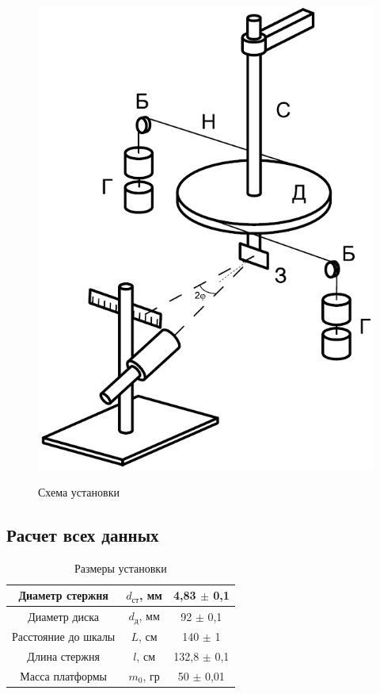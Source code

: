 \documentclass[a4paper]{article}
\begin{document}
\begin{figure}[!h]
    \begin{center}
        \includegraphics[scale=0.7]{ystanovka1.png}
        \begin{center}
        \caption{Схема установки}
        \end{center}
        \label{graphic1b}
    \end{center}
\end{figure}


\newpage
\subsection{Расчет всех данных}

\begin{table}[h!]
\begin{center}
\begin{tabular}{|c|c|c|}
\hline
Диаметр стержня     & $d_{\text{ст}}$, мм & 4,83 $\pm$ 0,1  \\ \hline
Диаметр диска       & $d_{\text{д}}$, мм  & 92 $\pm$ 0,1    \\ \hline
Расстояние до шкалы & $L$, см             & 140 $\pm$ 1     \\ \hline
Длина стержня       & $l$, см             & 132,8 $\pm$ 0,1 \\ \hline
Масса платформы     & $m_{0}$, гр         & 50 $\pm$ 0,01   \\ \hline
\end{tabular}
\caption{Размеры установки}
\end{center}
\end{table}
\end{document}
